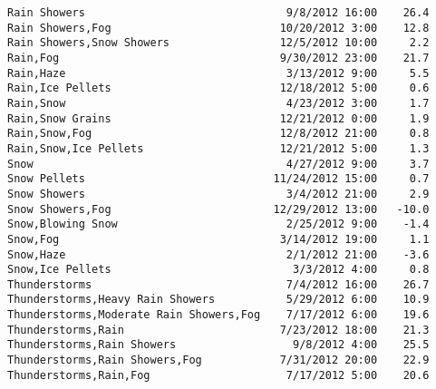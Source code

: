 \documentclass[11pt]{article}
\begin{document}
\begin{tcolorbox}[breakable, size=fbox, boxrule=.5pt, pad at break*=1mm, opacityfill=0]
\begin{Verbatim}[commandchars=\\\{\}]
Rain Showers                               9/8/2012 16:00    26.4
Rain Showers,Fog                          10/20/2012 3:00    12.8
Rain Showers,Snow Showers                 12/5/2012 10:00     2.2
Rain,Fog                                  9/30/2012 23:00    21.7
Rain,Haze                                  3/13/2012 9:00     5.5
Rain,Ice Pellets                          12/18/2012 5:00     0.6
Rain,Snow                                  4/23/2012 3:00     1.7
Rain,Snow Grains                          12/21/2012 0:00     1.9
Rain,Snow,Fog                             12/8/2012 21:00     0.8
Rain,Snow,Ice Pellets                     12/21/2012 5:00     1.3
Snow                                       4/27/2012 9:00     3.7
Snow Pellets                             11/24/2012 15:00     0.7
Snow Showers                               3/4/2012 21:00     2.9
Snow Showers,Fog                         12/29/2012 13:00   -10.0
Snow,Blowing Snow                          2/25/2012 9:00    -1.4
Snow,Fog                                  3/14/2012 19:00     1.1
Snow,Haze                                  2/1/2012 21:00    -3.6
Snow,Ice Pellets                            3/3/2012 4:00     0.8
Thunderstorms                              7/4/2012 16:00    26.7
Thunderstorms,Heavy Rain Showers           5/29/2012 6:00    10.9
Thunderstorms,Moderate Rain Showers,Fog    7/17/2012 6:00    19.6
Thunderstorms,Rain                        7/23/2012 18:00    21.3
Thunderstorms,Rain Showers                  9/8/2012 4:00    25.5
Thunderstorms,Rain Showers,Fog            7/31/2012 20:00    22.9
Thunderstorms,Rain,Fog                     7/17/2012 5:00    20.6


\end{Verbatim}
\end{tcolorbox}
\end{document}
